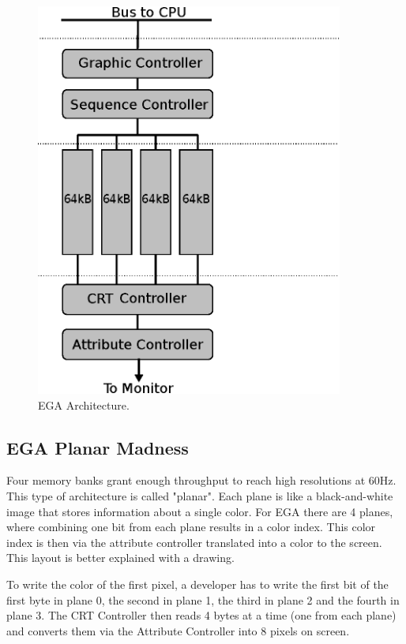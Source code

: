 \documentclass[book.tex]{subfiles}
\begin{document}
\begin{figure}[H]
\centering
\includegraphics[width=0.9\textwidth]{imgs/drawings/ega.eps}
\caption{EGA Architecture.}
\label{fig:vga_arch}
\end{figure}




\subsection{EGA Planar Madness}
\label{section:EGA_Planar_Madness}

Four memory banks grant enough throughput to reach high resolutions at 60Hz. This type of architecture is called "planar". Each plane is like a black-and-white image that stores information about a single color. For EGA there are 4 planes, where combining one bit from each plane results in a color index. This color index is then via the attribute controller translated into a color to the screen. This layout is better explained with a drawing.\\

\par
To write the color of the first pixel, a developer has to write the first bit of the first byte in plane 0, the second in plane 1, the third in plane 2 and the fourth in plane 3. The CRT Controller then reads 4 bytes at a time (one from each plane) and converts them via the Attribute Controller into 8 pixels on screen. \\
\end{document}
